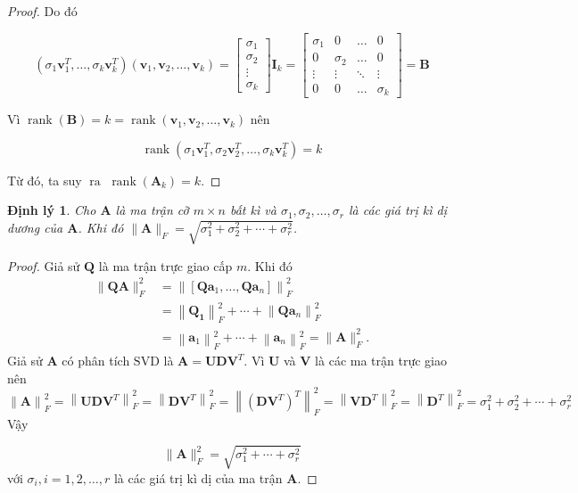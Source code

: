 \documentclass[12pt,a4paper,oneside]{report}
\newtheorem{dl}{Định lý}[section]
\numberwithin{equation}{section}
\begin{document}
\begin{proof}
Do đó

$$
\left(\sigma_{1} \mathbf{v}_{1}^{T}, \ldots, \sigma_{k} \mathbf{v}_{k}^{T}\right)\left(\mathbf{v}_{1}, \mathbf{v}_{2}, \ldots, \mathbf{v}_{k}\right)=\left[\begin{array}{c}
	\sigma_{1} \\
	\sigma_{2} \\
	\vdots \\
	\sigma_{k}
\end{array}\right] \mathbf{I}_{k}=\left[\begin{array}{cccc}
	\sigma_{1} & 0 & \ldots & 0 \\
	0 & \sigma_{2} & \ldots & 0 \\
	\vdots & \vdots & \ddots & \vdots \\
	0 & 0 & \ldots & \sigma_{k}
\end{array}\right]=\mathbf{B}
$$

Vì  $\operatorname{rank}(\mathbf{B})=k=\operatorname{rank}\left(\mathbf{v}_{1}, \mathbf{v}_{2}, \ldots, \mathbf{v}_{k}\right)$ nên

$$
\operatorname{rank}\left(\sigma_{1} \mathbf{v}_{1}^{T}, \sigma_{2} \mathbf{v}_{2}^{T}, \ldots, \sigma_{k} \mathbf{v}_{k}^{T}\right)=k
$$

Từ đó, ta suy $\operatorname{ra~} \operatorname{rank}\left(\mathbf{A}_{k}\right)=k$.
\end{proof}
\begin{dl} \cite{linh2016}
 Cho $\mathbf{A}$ là ma trận cỡ $m \times n$ bất kì và $\sigma_{1}, \sigma_{2}, \ldots, \sigma_{r}$ là các giá trị kì dị dương của $\mathbf{A}$. Khi đó $\|\mathbf{A}\|_{F}=\sqrt{\sigma_{1}^{2}+\sigma_{2}^{2}+\cdots+\sigma_{r}^{2}}$.
\end{dl} 
\begin{proof}
Giả sử $\mathbf{Q}$ là ma trận trực giao cấp $m$. Khi đó
\begin{align*}
\|\mathbf{Q} \mathbf{A}\|_{F}^{2}&=\left\|\left[\mathbf{Q} \mathbf{a}_{1}, \ldots, \mathbf{Q} \mathbf{a}_{n}\right]\right\|_{F}^{2}\\
&=\left\|\mathbf{Q}_{\mathbf{1}}\right\|_{F}^{2}+\cdots+\left\|\mathbf{Q} \mathbf{a}_{n}\right\|_{F}^{2}\\
&=\left\|\mathbf{a}_{1}\right\|_{F}^{2}+\cdots+\left\|\mathbf{a}_{n}\right\|_{F}^{2}=\|\mathbf{A}\|_{F}^{2}.
\end{align*}
Giả sử $\mathbf{A}$ có phân tích $\mathrm{SVD}$ là $\mathbf{A}=\mathbf{U D V}^{T}$. Vì $\mathbf{U}$ và $\mathbf{V}$ là các ma trận trực giao nên
$$
\left.\|\mathbf{A}\right\|_{F}^{2}=\left\|\mathbf{U D V}^{T}\right\|_{F}^{2}=\left\| \mathbf{D V}^{T}\right\|_{F}^{2}=\left\|\left(\mathbf{D V}^{T}\right)^{T}\right\|_{F}^{2}=\left\| \mathbf{V D}^{T}\right\|_{F}^{2}=\left\| \mathbf{D}^{T}\right \|_{F}^{2}=\sigma_{1}^{2}+\sigma_{2}^{2}+\cdots+\sigma_{r}^{2}
$$
Vậy

$$
\|\mathbf{A}\|_{F}^{2}=\sqrt{\sigma_{1}^{2}+\cdots+\sigma_{r}^{2}}
$$
với $\sigma_{i}, i=1,2, \ldots, r$ là các giá trị kì dị của ma trận $\mathbf{A}$.
\end{proof} 
\end{document}
